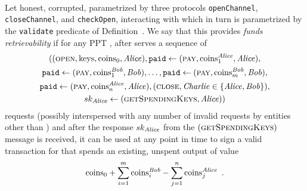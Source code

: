 \begin{definition} \ \\
  \label{def:retrievability}
  Let \alice{} honest, \bob{} corrupted, \fch{} parametrized by three protocols
  \texttt{openChannel}, \texttt{closeChannel}, and \texttt{checkOpen},
  interacting with \ledger{} which in turn is parametrized by the
  \texttt{validate} predicate of Definition~\TODO{}. We say that this \fch{}
  provides {\em funds retrievability} if for any PPT \adversary, after \fch{}
  serves a sequence of
  \begin{gather*}
    ((\textsc{open}, \mathrm{keys}, \mathrm{coins}_0, \mathit{Alice}), \mathtt{paid}
    \gets (\textsc{pay}, \mathrm{coins}_1^{\mathit{Alice}}, \mathit{Alice}), \\
    \mathtt{paid} \gets (\textsc{pay}, \mathrm{coins}_1^{\mathit{Bob}}, \mathit{Bob}), \dots,
    \mathtt{paid} \gets (\textsc{pay}, \mathrm{coins}_m^{\mathit{Bob}}, \mathit{Bob}), \\
    \mathtt{paid} \gets (\textsc{pay}, \mathrm{coins}_n^{\mathit{Alice}}, \mathit{Alice}),
    (\textsc{close}, \mathit{Charlie} \in \{\mathit{Alice}, \mathit{Bob}\}), \\
    sk_{\mathit{Alice}} \gets (\textsc{getSpendingKeys}, \mathit{Alice}))
  \end{gather*}
  requests (possibly interspersed with any number of invalid requests by
  entities other than \alice) and after the response $sk_{\mathit{Alice}}$ from the
  $(\textsc{getSpendingKeys})$ message is received, it can be used at any point
  in time to sign a valid transaction for \ledger{} that spends an existing,
  unspent output of value
  \begin{equation*}
    \mathrm{coins}_0 + \sum\limits_{i=1}^m\mathrm{coins}_i^{\mathit{Bob}} -
    \sum\limits_{j=1}^n\mathrm{coins}_j^{\mathit{Alice}} \enspace.
  \end{equation*}
\end{definition}
